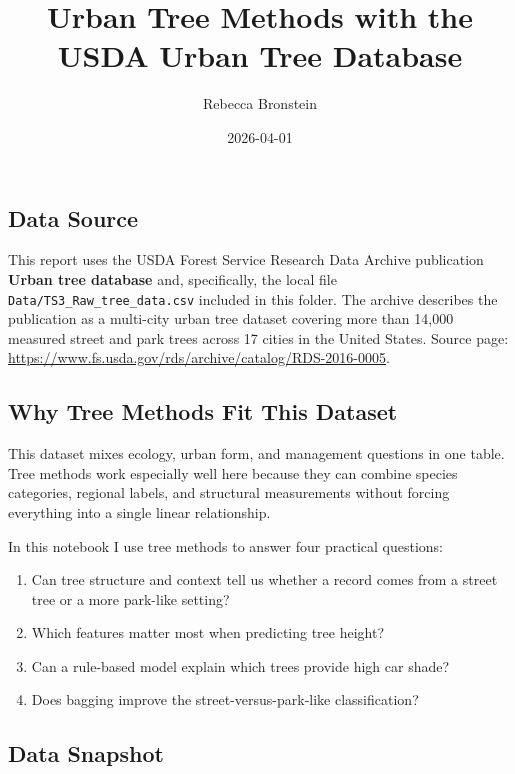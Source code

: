\documentclass[
  11pt,
]{article}
\title{Urban Tree Methods with the USDA Urban Tree Database}
\author{Rebecca Bronstein}
\date{2026-04-01}
\providecommand{\tightlist}{%
  \setlength{\itemsep}{0pt}\setlength{\parskip}{0pt}}
\begin{document}
\maketitle

{
\setcounter{tocdepth}{2}
\tableofcontents
}
\subsection{Data Source}\label{data-source}

This report uses the USDA Forest Service Research Data Archive
publication \textbf{Urban tree database} and, specifically, the local
file \texttt{Data/TS3\_Raw\_tree\_data.csv} included in this folder. The
archive describes the publication as a multi-city urban tree dataset
covering more than 14,000 measured street and park trees across 17
cities in the United States. Source page:
\url{https://www.fs.usda.gov/rds/archive/catalog/RDS-2016-0005}.

\subsection{Why Tree Methods Fit This
Dataset}\label{why-tree-methods-fit-this-dataset}

This dataset mixes ecology, urban form, and management questions in one
table. Tree methods work especially well here because they can combine
species categories, regional labels, and structural measurements without
forcing everything into a single linear relationship.

In this notebook I use tree methods to answer four practical questions:

\begin{enumerate}
\def\labelenumi{\arabic{enumi}.}
\tightlist
\item
  Can tree structure and context tell us whether a record comes from a
  street tree or a more park-like setting?
\item
  Which features matter most when predicting tree height?
\item
  Can a rule-based model explain which trees provide high car shade?
\item
  Does bagging improve the street-versus-park-like classification?
\end{enumerate}

\subsection{Data Snapshot}\label{data-snapshot}
\end{document}
